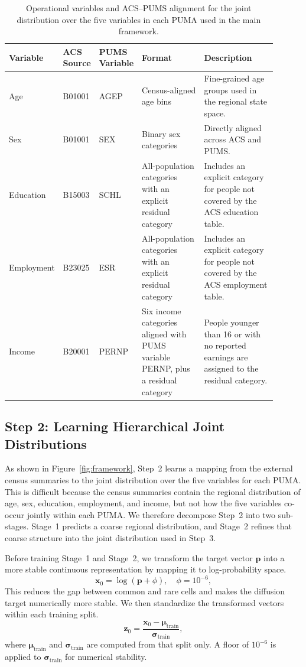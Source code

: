 \documentclass[11pt]{article}
\begin{document}
\begin{table}[!bhtp]
\centering
\small
\caption{Operational variables and ACS--PUMS alignment for the joint distribution over the five variables in each PUMA used in the main framework.}
\label{tab:var_attr}
\begin{tabular}{p{0.11\linewidth}p{0.13\linewidth}p{0.14\linewidth}p{0.24\linewidth}p{0.28\linewidth}}
\toprule
Variable & ACS Source & PUMS Variable & Format & Description \\
\midrule
Age & B01001 & AGEP & Census-aligned age bins & Fine-grained age groups used in the regional state space. \\
Sex & B01001 & SEX & Binary sex categories & Directly aligned across ACS and PUMS. \\
Education & B15003 & SCHL & All-population categories with an explicit residual category & Includes an explicit category for people not covered by the ACS education table. \\
Employment & B23025 & ESR & All-population categories with an explicit residual category & Includes an explicit category for people not covered by the ACS employment table. \\
Income & B20001 & PERNP & Six income categories aligned with PUMS variable PERNP, plus a residual category & People younger than 16 or with no reported earnings are assigned to the residual category. \\
\bottomrule
\end{tabular}
\end{table}

\subsection{Step 2: Learning Hierarchical Joint Distributions}
\label{sec:training_model}
As shown in Figure~\ref{fig:framework}, Step~2 learns a mapping from the external census summaries to the joint distribution over the five variables for each PUMA. This is difficult because the census summaries contain the regional distribution of age, sex, education, employment, and income, but not how the five variables co-occur jointly within each PUMA. We therefore decompose Step~2 into two sub-stages. Stage~1 predicts a coarse regional distribution, and Stage~2 refines that coarse structure into the joint distribution used in Step~3.

Before training Stage~1 and Stage~2, we transform the target vector $\mathbf{p}$ into a more stable continuous representation by mapping it to log-probability space.
\[
  \mathbf{x}_0 = \log(\mathbf{p}+\phi), \quad \phi=10^{-6},
\]
This reduces the gap between common and rare cells and makes the diffusion target numerically more stable. We then standardize the transformed vectors within each training split.
\[
  \mathbf{z}_0 = \frac{\mathbf{x}_0 - \boldsymbol{\mu}_{\text{train}}}{\boldsymbol{\sigma}_{\text{train}}},
\]
where $\boldsymbol{\mu}_{\text{train}}$ and $\boldsymbol{\sigma}_{\text{train}}$ are computed from that split only. A floor of $10^{-6}$ is applied to $\boldsymbol{\sigma}_{\text{train}}$ for numerical stability.
\end{document}
